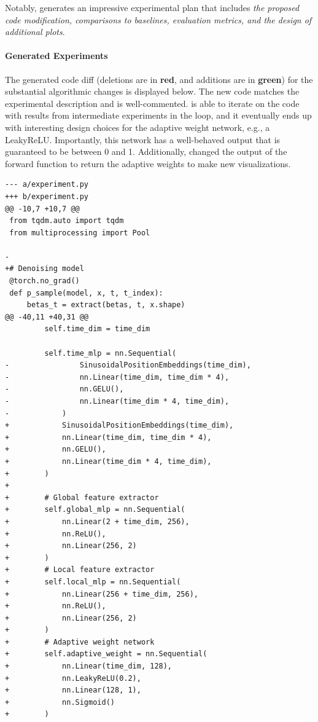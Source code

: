 \begin{appendices}
Notably, \ouralgo generates an impressive experimental plan that includes \emph{the proposed code modification, comparisons to baselines, evaluation metrics, and the design of additional plots}.

\begin{tcolorbox}[
  breakable,
  colback  = blue!5!white,
  colframe = blue!75!black,
  title    = {Idea - \texttt{adaptive\_dual\_scale\_denoising}},
  fontupper=\scriptsize\ttfamily,
]
\end{tcolorbox}

\paragraph{Generated Experiments}
The generated code diff (deletions are in \textcolor{BrickRed}{\textbf{red}}, and additions are in \textcolor{OliveGreen}{\textbf{green}}) for the substantial algorithmic changes is displayed below. The new code matches the experimental description and is well-commented. \ouralgo is able to iterate on the code with results from intermediate experiments in the loop, and it eventually ends up with interesting design choices for the adaptive weight network, e.g., a LeakyReLU. Importantly, this network has a well-behaved output that is guaranteed to be between 0 and 1. Additionally, \ouralgo changed the output of the forward function to return the adaptive weights to make new visualizations.

\begin{verbatim}
--- a/experiment.py
+++ b/experiment.py
@@ -10,7 +10,7 @@
 from tqdm.auto import tqdm
 from multiprocessing import Pool

-
+# Denoising model
 @torch.no_grad()
 def p_sample(model, x, t, t_index):
     betas_t = extract(betas, t, x.shape)
@@ -40,11 +40,31 @@
         self.time_dim = time_dim

         self.time_mlp = nn.Sequential(
-                SinusoidalPositionEmbeddings(time_dim),
-                nn.Linear(time_dim, time_dim * 4),
-                nn.GELU(),
-                nn.Linear(time_dim * 4, time_dim),
-            )
+            SinusoidalPositionEmbeddings(time_dim),
+            nn.Linear(time_dim, time_dim * 4),
+            nn.GELU(),
+            nn.Linear(time_dim * 4, time_dim),
+        )
+
+        # Global feature extractor
+        self.global_mlp = nn.Sequential(
+            nn.Linear(2 + time_dim, 256),
+            nn.ReLU(),
+            nn.Linear(256, 2)
+        )
+        # Local feature extractor
+        self.local_mlp = nn.Sequential(
+            nn.Linear(256 + time_dim, 256),
+            nn.ReLU(),
+            nn.Linear(256, 2)
+        )
+        # Adaptive weight network
+        self.adaptive_weight = nn.Sequential(
+            nn.Linear(time_dim, 128),
+            nn.LeakyReLU(0.2),
+            nn.Linear(128, 1),
+            nn.Sigmoid()
+        )


\end{verbatim}
\end{appendices}
